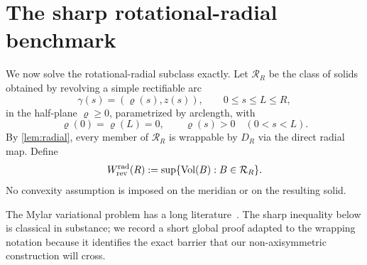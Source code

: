 \section{The sharp rotational-radial benchmark}\label{sec:rotational}
We now solve the rotational-radial subclass exactly.  Let $\mathcal R_R$ be the class of solids obtained by revolving a simple rectifiable arc
\[
\gamma(s)=(\varrho(s),z(s)),\qquad 0\le s\le L\le R,
\]
in the half-plane $\varrho\ge0$, parametrized by arclength, with
\[
\varrho(0)=\varrho(L)=0,
\qquad
\varrho(s)>0\quad(0<s<L).
\]
By \cref{lem:radial}, every member of $\mathcal R_R$ is wrappable by $D_R$ via the direct radial map.  Define
\[
W_{\rm rev}^{\rm rad}(R):=
\sup\{\operatorname{Vol}(B):B\in\mathcal R_R\}.
\]
No convexity assumption is imposed on the meridian or on the resulting solid.

The Mylar variational problem has a long literature~\cite{Paulsen1994,MladenovOprea2003}.  The sharp inequality below is classical in substance; we record a short global proof adapted to the wrapping notation because it identifies the exact barrier that our non-axisymmetric construction will cross.


